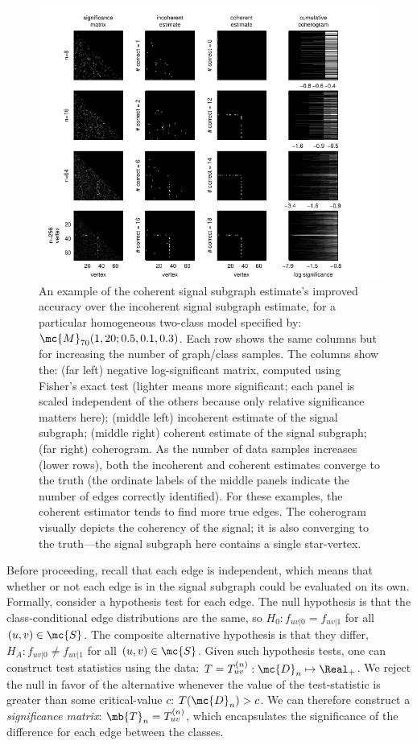 \documentclass[10pt,journal,cspaper,compsoc]{IEEEtran}
\begin{document}
\begin{figure}[tb!]
	\centering
		\includegraphics[width=1.0\linewidth]{../figs/homo_V70_s20_p10_q30_SigIncCohErogram.pdf}
	\caption{An example of the coherent signal subgraph estimate's improved accuracy over the incoherent signal subgraph estimate, for a particular homogeneous two-class model specified by: $\mc{M}_{70}(1,20;0.5,0.1,0.3)$. Each row shows the same columns but for increasing the number of graph/class samples.  The columns show the: (far left) negative log-significant matrix, computed using Fisher's exact test (lighter means more significant; each panel is scaled independent of the others because only relative significance matters here); (middle left) incoherent estimate of the signal subgraph; (middle right) coherent estimate of the signal subgraph; (far right) coherogram.  As the number of data samples increases (lower rows), both the incoherent and coherent estimates converge to the truth (the ordinate labels of the middle panels indicate the number of edges correctly identified).  For these examples, the coherent estimator tends to find more true edges.  The coherogram visually depicts the coherency of the signal; it is also converging to the truth---the signal subgraph here contains a single star-vertex.}
	\label{fig:4x4}
\end{figure}



Before proceeding, recall that each edge is independent, which means that whether or not each edge is in the signal subgraph could be evaluated on its own.  Formally, consider a hypothesis test for each edge.  The null hypothesis is that the class-conditional edge distributions are the same, so $H_0: f_{uv|0}=f_{uv|1}$ for all $(u,v) \in \mc{S}$.  The composite alternative hypothesis is that they differ, $H_A: f_{uv|0} \neq f_{uv|1}$ for all $(u,v) \in \mc{S}$.  Given such hypothesis tests, one can construct test statistics using the data: $T=T_{uv}^{(n)}: \mc{D}_n \mapsto \Real_+$.  We reject the null in favor of the alternative whenever the value of the test-statistic is greater than some critical-value $c$: $T(\mc{D}_n)>c$.  We can therefore construct a \emph{significance matrix}: $\mb{T}_n=T_{uv}^{(n)}$, which encapsulates the significance of the difference for each edge between the classes.  
\end{document}
